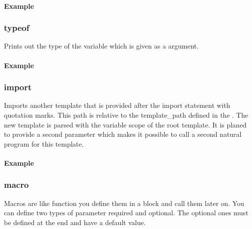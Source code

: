 \documentclass[letterpaper,10pt,english]{sphinxmanual}
\begin{document}
\paragraph{Example}
\label{\detokenize{html-parser:id2}}


\subsubsection{typeof}
\label{\detokenize{html-parser:typeof}}
Prints out the type of the variable which is given as a argument.


\paragraph{Example}
\label{\detokenize{html-parser:id3}}


\subsubsection{import}
\label{\detokenize{html-parser:import}}
Imports another template that is provided after the import statement with quotation marks. This path is relative to the template\_path defined in the {\hyperref[\detokenize{webserver:webserver-config}]{}}. The new template is parsed with the variable scope of the root template. It is planed to provide a second parameter which makes it possible to call a second natural program for this template.


\paragraph{Example}
\label{\detokenize{html-parser:id4}}


\subsubsection{macro}
\label{\detokenize{html-parser:macro}}
Macros are like function you define them in a block and call them later on. You can define two types of parameter required and optional. The optional ones must be defined at the end and have a default value.
\end{document}

